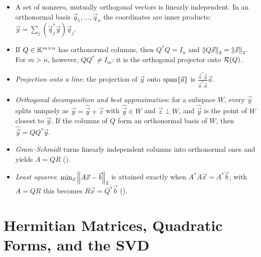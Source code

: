 \begin{itemize}
  \item A set of nonzero, mutually orthogonal vectors is linearly independent. In an orthonormal basis $\vec{q}_1, \dots, \vec{q}_n$ the coordinates are inner products: $\vec{y} = \sum_j (\vec{q}_j^\ast\vec{y})\vec{q}_j$.
  \item If $Q \in \mathbb{K}^{m \times n}$ has orthonormal columns, then $Q^\ast Q = I_n$ and $\left\lVert Q\vec{x} \right\rVert_2 = \left\lVert \vec{x} \right\rVert_2$. For $m > n$, however, $QQ^\ast \ne I_m$: it is the orthogonal projector onto $\mathcal{R}(Q)$.
  \item \emph{Projection onto a line}: the projection of $\vec{y}$ onto $\operatorname{span}\{\vec{a}\}$ is $\frac{\vec{a}^\ast\vec{y}}{\vec{a}^\ast\vec{a}}\vec{a}$.
  \item \emph{Orthogonal decomposition and best approximation}: for a subspace $W$, every $\vec{y}$ splits uniquely as $\vec{y} = \hat{\vec{y}} + \vec{z}$ with $\hat{\vec{y}} \in W$ and $\vec{z} \perp W$, and $\hat{\vec{y}}$ is the point of $W$ closest to $\vec{y}$. If the columns of $Q$ form an orthonormal basis of $W$, then $\hat{\vec{y}} = QQ^\ast\vec{y}$.
  \item \emph{Gram--Schmidt} turns linearly independent columns into orthonormal ones and yields $A = QR$ ().
  \item \emph{Least squares}: $\min_{\vec{x}}\left\lVert A\vec{x} - \vec{b} \right\rVert_2$ is attained exactly when $A^\ast A\vec{x} = A^\ast\vec{b}$; with $A = QR$ this becomes $R\vec{x} = Q^\ast\vec{b}$ ().
\end{itemize}

\section{Hermitian Matrices, Quadratic Forms, and the SVD}
\label{sec:herm-basics}


